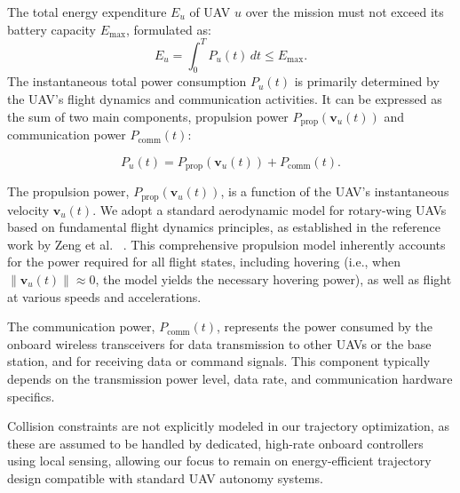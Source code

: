 \documentclass[10pt,conference,letterpaper]{IEEEtran}
\begin{document}
The total energy expenditure $E_u$ of UAV $u$ over the mission must not exceed its battery capacity $E_{\text{max}}$, formulated as:
\begin{equation}
E_u = \int_{0}^{T} P_{u}(t) \, dt \leq E_{\text{max}}.
\label{eq:total_energy_expenditure}
\end{equation}
The instantaneous total power consumption $P_{u}(t)$ is primarily determined by the UAV's flight dynamics and communication activities. It can be expressed as the sum of two main components, propulsion power $P_{\text{prop}}(\mathbf{v}_u(t))$ and communication power $P_{\text{comm}}(t)$:


\begin{equation}
P_{u}(t) = P_{\text{prop}}(\mathbf{v}_u(t)) + P_{\text{comm}}(t).
\label{eq:instantaneous_power_consumption}
\end{equation}

The propulsion power, $P_{\text{prop}}(\mathbf{v}_u(t))$, is a function of the UAV's instantaneous velocity $\mathbf{v}_u(t)$. We adopt a standard aerodynamic model for rotary-wing UAVs based on fundamental flight dynamics principles, as established in the reference work by Zeng et al. ~\cite{DBLP:journals/twc/ZengXZ19}. %
This comprehensive propulsion model inherently accounts for the power required for all flight states, including hovering (i.e., when $\|\mathbf{v}_u(t)\| \approx 0$, the model yields the necessary hovering power), as well as flight at various speeds and accelerations.





The communication power, $P_{\text{comm}}(t)$, represents the power consumed by the onboard wireless transceivers for data transmission to other UAVs or the base station, and for receiving data or command signals. This component typically depends on the transmission power level, data rate, and communication hardware specifics.



Collision constraints are not explicitly modeled in our trajectory optimization, as these are assumed to be handled by dedicated, high-rate onboard controllers using local sensing, allowing our focus to remain on energy-efficient trajectory design compatible with standard UAV autonomy systems.
\end{document}
